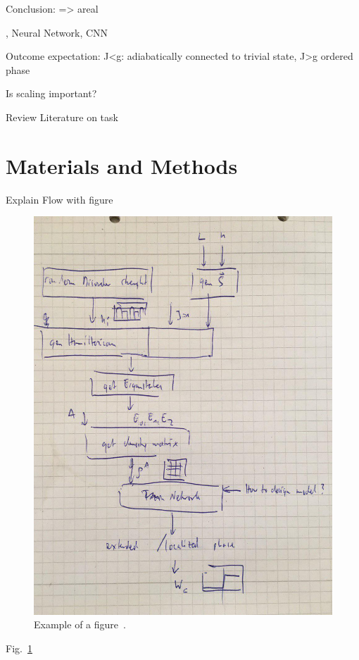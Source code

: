 \documentclass[reprint,amsmath,amssymb,aps,prb]{revtex4-2}
\begin{document}
Conclusion: => areal

, Neural Network, CNN

Outcome expectation: J<g: adiabatically connected to trivial state, J>g ordered phase

Is scaling important?

Review Literature on task

\section{Materials and Methods}%

Explain Flow with figure

\begin{figure}[h!]
	\includegraphics[width=0.99\linewidth]{figures/flowchart.jpg}
	\caption{Example of a figure~\cite{Orus2013}.}
	\label{fig:example}
\end{figure}

Fig.~\ref{fig:example}
\end{document}
